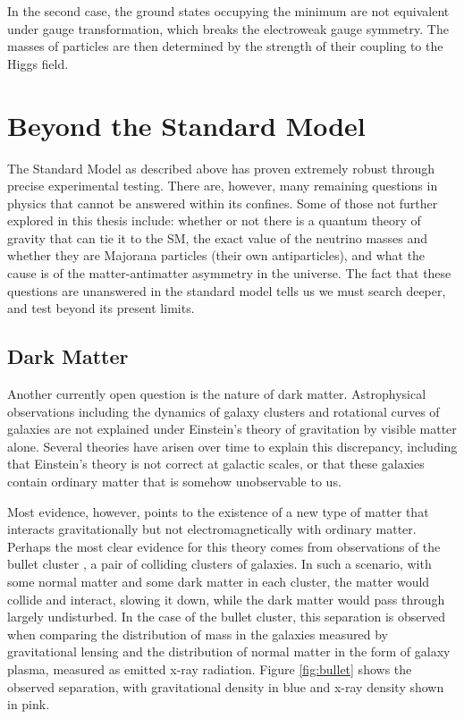 In the second case, the ground states occupying the minimum are not equivalent under gauge transformation, which breaks the electroweak gauge symmetry. The masses of particles are then determined by the strength of their coupling to the Higgs field.

\section{Beyond the Standard Model}
The Standard Model as described above has proven extremely robust through precise experimental testing. There are, however, many remaining questions in physics that cannot be answered within its confines. Some of those not further explored in this thesis include: whether or not there is a quantum theory of gravity that can tie it to the SM, the exact value of the neutrino masses and whether they are Majorana particles (their own antiparticles), and what the cause is of the matter-antimatter asymmetry in the universe. The fact that these questions are unanswered in the standard model tells us we must search deeper, and test beyond its present limits.

\subsection{Dark Matter}
Another currently open question is the nature of dark matter. Astrophysical observations including the dynamics of galaxy clusters \cite{Zwicky} and rotational curves of galaxies \cite{Rubin} are not explained under Einstein's theory of gravitation by visible matter alone. Several theories have arisen over time to explain this discrepancy, including that Einstein's theory is not correct at galactic scales, or that these galaxies contain ordinary matter that is somehow unobservable to us.

Most evidence, however, points to the existence of a new type of matter that interacts gravitationally but not electromagnetically with ordinary matter. Perhaps the most clear evidence for this theory comes from observations of the bullet cluster \cite{Clowe}, a pair of colliding clusters of galaxies. In such a scenario, with some normal matter and some dark matter in each cluster, the matter would collide and interact, slowing it down, while the dark matter would pass through largely undisturbed. In the case of the bullet cluster, this separation is observed when comparing the distribution of mass in the galaxies measured by gravitational lensing and the distribution of normal matter in the form of galaxy plasma, measured as emitted x-ray radiation. Figure \ref{fig:bullet} shows the observed separation, with gravitational density in blue and x-ray density shown in pink.

